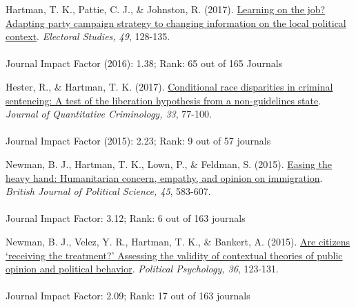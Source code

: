 \documentclass[12pt]{article}
\begin{document}
\begin{bibenum}
    \item {Hartman, T. K.}, Pattie, C. J., \& Johnston, R. (2017).
    	  \href{http://tkhartman.staff.shef.ac.uk/_content/documents/Hartman.Pattie.Johnston.2017.Electoral.Studies.pdf}
          {Learning on the job? Adapting party campaign strategy 
          to changing information on the local political context}. 
          \emph{Electoral Studies, 49}, 128-135.\\
          \\
          Journal Impact Factor (2016): 1.38; Rank: 65 out of 165 Journals
          
    \item Hester, R., \& {Hartman, T. K.} (2017). 
          \href{http://tkhartman.staff.shef.ac.uk/_content/documents/Hester.Hartman2016.Journal.of.Quantitative.Criminology.pdf}
          {Conditional race disparities in criminal sentencing: 
          A test of the liberation hypothesis from a non-guidelines state}. 
          \emph{Journal of Quantitative Criminology, 33}, 77-100.\\
          \\
          Journal Impact Factor (2015): 2.23; Rank: 9 out of 57 journals
          
    \item Newman, B. J., {Hartman, T. K.}, Lown, P., \& Feldman, S. (2015). 
          \href{http://tkhartman.staff.shef.ac.uk/_content/documents/Newman.Hartman.Feldman.Lown.2015.British.Journal.of.Political.Science.pdf}
          {Easing the heavy hand: Humanitarian concern, empathy, and 
          opinion on immigration}. 
          \emph{British Journal of Political Science, 45}, 583-607.\\
          \\
          Journal Impact Factor: 3.12; Rank: 6 out of 163 journals
           
    \item Newman, B. J., Velez, Y. R., {Hartman, T. K.}, \& Bankert, A. (2015). 
          \href{http://tkhartman.staff.shef.ac.uk/_content/documents/Newman.Velez.Hartman.Bankert.2015.Political.Psychology.pdf}
          {Are citizens `receiving the treatment?' Assessing the validity 
          of contextual theories of public opinion and political behavior}. 
          \emph{Political Psychology, 36}, 123-131.\\
          \\
          Journal Impact Factor: 2.09; Rank: 17 out of 163 journals


\end{bibenum}
\end{document}
